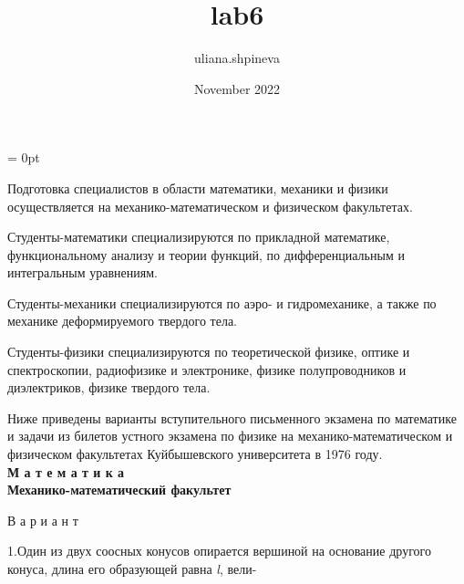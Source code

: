 \thispagestyle{fancy}
\fancyhf{}
\fancyfoot[R]{\thepage}
\renewcommand{\headrulewidth}{0pt}
\renewcommand{\footrulewidth}{0pt}
\footskip = 0pt

\title{lab6}
\author{uliana.shpineva }
\date{November 2022}


\setcounter{page}{49}

\begin{minipage}[bs]{0.45\textwidth}
\qquad Подготовка специалистов в области математики, механики и физики осуществляется на механико-математическом и физическом факультетах.

\qquad Студенты-математики специализируются по прикладной математике, функциональному анализу и теории функций, по дифференциальным и интегральным уравнениям.

\qquad Студенты-механики специализируются по аэро- и гидромеханике, а также по механике деформируемого твердого тела.

\qquad Студенты-физики специализируются по теоретической физике, оптике и спектроскопии, радиофизике и электронике, физике полупроводников и диэлектриков, физике твердого тела.

\qquad Ниже приведены варианты вступительного письменного экзамена по математике и задачи из билетов устного экзамена по физике на механико-математическом и физическом факультетах Куйбышевского университета в 1976 году.
\newline\\
\textbf{М а т е м а т и к а}\\

\textbf{Механико-математический факультет}

\qquad В а р и а н т

\qquad 1.Один из двух соосных конусов опирается вершиной на основание другого конуса, длина его образующей равна \textit{l}, вели-
\end{minipage}
\qquad
